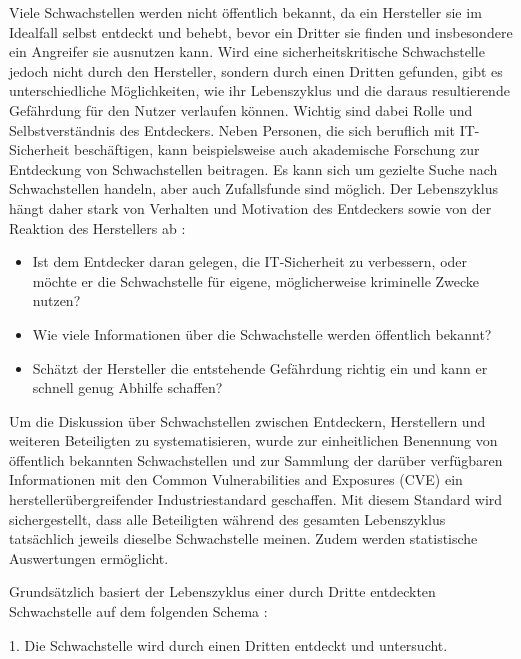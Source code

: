 \documentclass[12pt,oneside,a4paper,parskip]{scrbook}
\begin{document}
  Viele Schwachstellen werden nicht öffentlich bekannt, da ein Hersteller sie im Idealfall
  selbst entdeckt und behebt, bevor ein Dritter sie finden und insbesondere ein Angreifer
  sie ausnutzen kann.
  Wird eine sicherheitskritische Schwachstelle jedoch nicht durch den Hersteller, sondern
  durch einen Dritten gefunden, gibt es unterschiedliche Möglichkeiten, wie ihr Lebenszyklus und die daraus resultierende Gefährdung für den Nutzer verlaufen können.
  Wichtig sind dabei Rolle und Selbstverständnis des Entdeckers. Neben Personen, die
  sich beruflich mit IT-Sicherheit beschäftigen, kann beispielsweise auch akademische
  Forschung zur Entdeckung von Schwachstellen beitragen. Es kann sich um gezielte Suche nach Schwachstellen handeln, aber auch Zufallsfunde sind möglich.
  Der Lebenszyklus hängt daher stark von Verhalten und Motivation des Entdeckers sowie von der Reaktion des Herstellers ab \cite{BSI3}:
  \begin{itemize}
    \item Ist dem Entdecker daran gelegen, die IT-Sicherheit zu verbessern, oder möchte er die
    Schwachstelle für eigene, möglicherweise kriminelle Zwecke nutzen?
    \item Wie viele Informationen über die Schwachstelle werden öffentlich bekannt?
    \item Schätzt der Hersteller die entstehende Gefährdung richtig ein und kann er schnell genug Abhilfe
  schaffen?
  \end{itemize}
  Um die Diskussion über Schwachstellen zwischen Entdeckern, Herstellern und weiteren
  Beteiligten zu systematisieren, wurde zur einheitlichen Benennung von öffentlich bekannten Schwachstellen und zur Sammlung der darüber verfügbaren Informationen
  mit den Common Vulnerabilities and Exposures (CVE) ein herstellerübergreifender Industriestandard geschaffen. Mit diesem Standard wird sichergestellt, dass alle Beteiligten während des gesamten Lebenszyklus tatsächlich jeweils dieselbe Schwachstelle meinen. Zudem werden statistische Auswertungen ermöglicht.

  Grundsätzlich basiert der Lebenszyklus einer durch Dritte entdeckten Schwachstelle auf dem
  folgenden Schema \cite{BSI3}:

  1. Die Schwachstelle wird durch einen Dritten entdeckt und untersucht.
\end{document}
